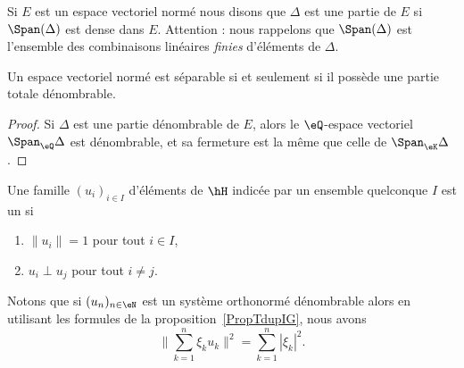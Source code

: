 \begin{definition}      \label{DEFooQVPHooJaSWyF}
	Si \( E\) est un espace vectoriel normé nous disons que \( \Delta\) est une partie  de \( E\) si \( \Span(\Delta)\) est dense dans \( E\). Attention : nous rappelons que \( \Span(\Delta)\) est l'ensemble des combinaisons linéaires \emph{finies} d'éléments de \( \Delta\).
\end{definition}

\begin{proposition}     \label{PROPooZMWHooVwvNBY}
	Un espace vectoriel normé est séparable si et seulement si il possède une partie totale dénombrable.
\end{proposition}

\begin{proof}
	Si \( \Delta\) est une partie dénombrable de \( E\), alors le \( \eQ\)-espace vectoriel \( \Span_{\eQ}\Delta\) est dénombrable, et sa fermeture est la même que celle de \( \Span_{\eK}\Delta\).
\end{proof}

\begin{definition}
	Une famille \( (u_i)_{i\in I}\) d'éléments de \( \hH\) indicée par un ensemble quelconque \( I\) est un 
	 si
	\begin{enumerate}
		\item
		      \( \| u_i \|=1\) pour tout \( i\in I\),
		\item
		      \( u_i\perp u_j\) pour tout \( i\neq j\).
	\end{enumerate}
\end{definition}
Notons que si \( (u_n)_{n\in \eN}\) est un système orthonormé dénombrable alors en utilisant les formules de la proposition~\ref{PropTdupIG}, nous avons
\begin{equation}    \label{EqCLQbMy}
	\big\| \sum_{k=1}^n\xi_ku_k \big\|^2=\sum_{k=1}^n| \xi_k |^2.
\end{equation}

